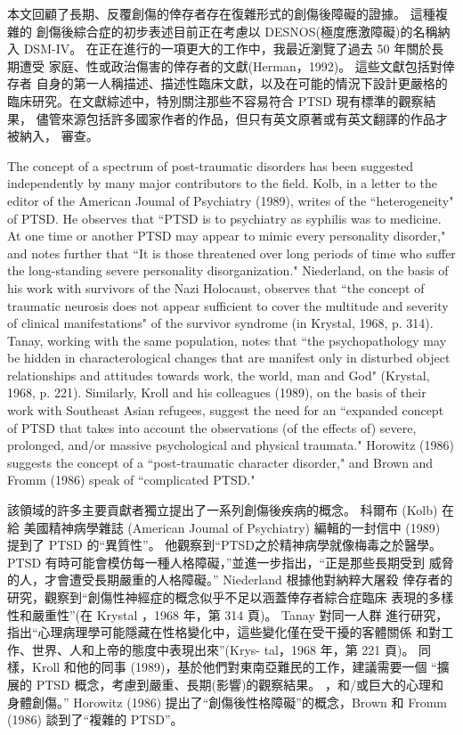\documentclass[12pt]{article}
\begin{document}
    本文回顧了長期、反覆創傷的倖存者存在復雜形式的創傷後障礙的證據。 這種複雜的
    創傷後綜合症的初步表述目前正在考慮以 DESNOS(極度應激障礙)的名稱納入
    DSM-IV。 在正在進行的一項更大的工作中，我最近瀏覽了過去 50 年關於長期遭受
    家庭、性或政治傷害的倖存者的文獻(Herman，1992)。 這些文獻包括對倖存者
    自身的第一人稱描述、描述性臨床文獻，以及在可能的情況下設計更嚴格的
    臨床研究。在文獻綜述中，特別關注那些不容易符合 PTSD 現有標準的觀察結果，
    儘管來源包括許多國家作者的作品，但只有英文原著或有英文翻譯的作品才被納入，
    審查。

    The concept of a spectrum of post-traumatic disorders has been suggested
    independently by many major contributors to the field. Kolb, in a letter to
    the editor of the American Joumal of Psychiatry (1989), writes of the
    ``heterogeneity" of PTSD. He observes that ``PTSD is to psychiatry as
    syphilis was to medicine. At one time or another PTSD may appear to mimic
    every personality disorder," and notes further that ``It is those
    threatened over long periods of time who suffer the long-standing severe
    personality disorganization." Niederland, on the basis of his work with
    survivors of the Nazi Holocaust, observes that ``the concept of traumatic
    neurosis does not appear sufficient to cover the multitude and severity of
    clinical manifestations" of the survivor syndrome (in Krystal, 1968,
    p. 314). Tanay, working with the same population, notes that ``the
    psychopathology may be hidden in characterological changes that are
    manifest only in disturbed object relationships and attitudes towards work,
    the world, man and God" (Krystal, 1968, p. 221). Similarly, Kroll and his
    colleagues (1989), on the basis of their work with Southeast Asian
    refugees, suggest the need for an ``expanded concept of PTSD that takes
    into account the observations (of the effects of) severe, prolonged, and/or
    massive psychological and physical traumata." Horowitz (1986) suggests the
    concept of a ``post-traumatic character disorder," and Brown and Fromm
    (1986) speak of ``complicated PTSD."

    該領域的許多主要貢獻者獨立提出了一系列創傷後疾病的概念。 科爾布 (Kolb) 在給
    美國精神病學雜誌 (American Joumal of Psychiatry) 編輯的一封信中 (1989)
    提到了 PTSD 的“異質性”。 他觀察到“PTSD之於精神病學就像梅毒之於醫學。
    PTSD 有時可能會模仿每一種人格障礙，”並進一步指出，“正是那些長期受到
    威脅的人，才會遭受長期嚴重的人格障礙。” Niederland 根據他對納粹大屠殺
    倖存者的研究，觀察到“創傷性神經症的概念似乎不足以涵蓋倖存者綜合症臨床
    表現的多樣性和嚴重性”(在 Krystal ，1968 年，第 314 頁)。 Tanay 對同一人群
    進行研究，指出“心理病理學可能隱藏在性格變化中，這些變化僅在受干擾的客體關係
    和對工作、世界、人和上帝的態度中表現出來”(Krys- tal，1968 年，第 221 頁)。
    同樣，Kroll 和他的同事 (1989)，基於他們對東南亞難民的工作，建議需要一個
    “擴展的 PTSD 概念，考慮到嚴重、長期(影響)的觀察結果。 ，和/或巨大的心理和
    身體創傷。” Horowitz (1986) 提出了“創傷後性格障礙”的概念，Brown 和 Fromm
    (1986) 談到了“複雜的 PTSD”。
\end{document}
